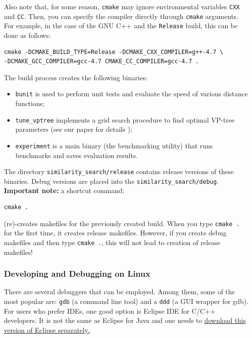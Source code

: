 \documentclass[runningheads,a4paper]{llncs}
\newcommand{\ttt}[1]{\texttt{#1}}
\begin{document}
{Also note that, for some reason, \ttt{cmake} may ignore environmental variables \ttt{CXX} and \ttt{CC}.
Then, you can specify the compiler directly through \ttt{cmake} arguments.
For example, in the case of the GNU C++ and the \ttt{Release} build, 
this can be done as follows:
\begin{verbatim}
cmake -DCMAKE_BUILD_TYPE=Release -DCMAKE_CXX_COMPILER=g++-4.7 \
-DCMAKE_GCC_COMPILER=gcc-4.7 CMAKE_CC_COMPILER=gcc-4.7 .
\end{verbatim} 

The build process creates the following binaries:
\begin{itemize}
\item \ttt{bunit} is used to perform unit tests and 
evaluate the speed of various distance functions;
\item \ttt{tune\_vptree} implements a grid search procedure to find optimal VP-tree parameters (see our paper for details \cite{Boytsov_and_Bilegsaikhan:nips2013});
\item \ttt{experiment} is a main binary (the benchmarking utility) that runs benchmarks and saves evaluation results.
\end{itemize}

The directory \ttt{similarity\_search/release} contains release versions of
these binaries. Debug versions are placed into the \ttt{similarity\_search/debug}.
\textbf{Important note:} a shortcut command:
\begin{verbatim}
cmake .
\end{verbatim} 
(re)-creates makefiles for the previously 
created build. When you type \ttt{cmake .} for the first time,
it creates release makefiles. However, if you create debug
makefiles and then type \ttt{cmake .}, 
this will not lead to creation of release makefiles! 

\subsubsection{Developing and Debugging on Linux}
There are several debuggers that can be employed.
Among them, some of the most popular are: \ttt{gdb} (a command line tool)
and a \ttt{ddd} (a GUI wrapper for gdb).
For users who prefer IDEs, one good option is Eclipse IDE for C/C++
developers.
It is not the same as Eclipse for Java and one needs 
to \href{http://www.eclipse.org/downloads/moreinfo/c.php}{download 
this version of Eclipse separately.}.

}
\end{document}
